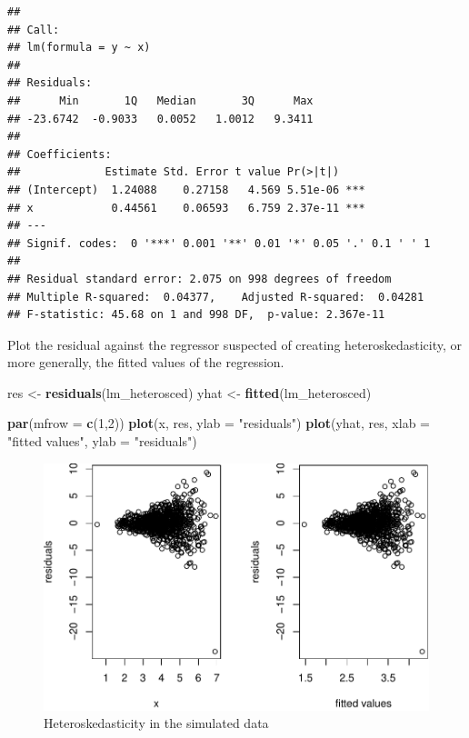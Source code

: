 \documentclass[]{book}
\newenvironment{Shaded}{\begin{snugshade}}{\end{snugshade}}
\newcommand{\DataTypeTok}[1]{\textcolor[rgb]{0.13,0.29,0.53}{#1}}
\newcommand{\DecValTok}[1]{\textcolor[rgb]{0.00,0.00,0.81}{#1}}
\newcommand{\KeywordTok}[1]{\textcolor[rgb]{0.13,0.29,0.53}{\textbf{#1}}}
\newcommand{\NormalTok}[1]{#1}
\newcommand{\StringTok}[1]{\textcolor[rgb]{0.31,0.60,0.02}{#1}}
\begin{document}
\begin{verbatim}
## 
## Call:
## lm(formula = y ~ x)
## 
## Residuals:
##      Min       1Q   Median       3Q      Max 
## -23.6742  -0.9033   0.0052   1.0012   9.3411 
## 
## Coefficients:
##             Estimate Std. Error t value Pr(>|t|)    
## (Intercept)  1.24088    0.27158   4.569 5.51e-06 ***
## x            0.44561    0.06593   6.759 2.37e-11 ***
## ---
## Signif. codes:  0 '***' 0.001 '**' 0.01 '*' 0.05 '.' 0.1 ' ' 1
## 
## Residual standard error: 2.075 on 998 degrees of freedom
## Multiple R-squared:  0.04377,    Adjusted R-squared:  0.04281 
## F-statistic: 45.68 on 1 and 998 DF,  p-value: 2.367e-11
\end{verbatim}

Plot the residual against the regressor suspected of creating heteroskedasticity, or more generally, the fitted values of the regression.

\begin{Shaded}
\begin{Highlighting}[]
\NormalTok{res <-}\StringTok{ }\KeywordTok{residuals}\NormalTok{(lm_heterosced)}
\NormalTok{yhat <-}\StringTok{ }\KeywordTok{fitted}\NormalTok{(lm_heterosced)}
\end{Highlighting}
\end{Shaded}

\begin{Shaded}
\begin{Highlighting}[]
\KeywordTok{par}\NormalTok{(}\DataTypeTok{mfrow =} \KeywordTok{c}\NormalTok{(}\DecValTok{1}\NormalTok{,}\DecValTok{2}\NormalTok{))}
\KeywordTok{plot}\NormalTok{(x, res, }\DataTypeTok{ylab =} \StringTok{"residuals"}\NormalTok{)}
\KeywordTok{plot}\NormalTok{(yhat, res, }\DataTypeTok{xlab =} \StringTok{"fitted values"}\NormalTok{, }\DataTypeTok{ylab =} \StringTok{"residuals"}\NormalTok{)}
\end{Highlighting}
\end{Shaded}

\begin{figure}

{\centering \includegraphics[width=0.8\linewidth]{MEM5220_R_files/figure-latex/fig10-1} 

}

\caption{Heteroskedasticity in the simulated data}\label{fig:fig10}
\end{figure}
\end{document}
